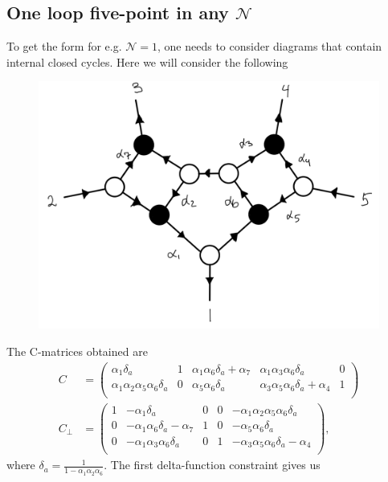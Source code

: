 \documentclass[letter,11pt]{article}
\begin{document}
\subsection{One loop five-point in any $\mathcal{N}$}
To get the form for e.g. $\mathcal{N}=1$, one needs to consider diagrams that contain internal closed  cycles. Here we will consider the following
\begin{figure}[H]
	\centering
	\includegraphics[width=0.5\linewidth]{5pt3l_2}
	\caption{}
	\label{fig:5pt3l_2}
\end{figure}
The C-matrices obtained are
\begin{equation}
	\begin{aligned}
		C
		&=\left(
		\begin{array}{ccccc}
			\alpha _1 \delta_a & 1 & \alpha _1 \alpha _6 \delta_a+\alpha _7 & \alpha _1 \alpha _3 \alpha _6 \delta_a & 0 \\
			\alpha _1 \alpha _2 \alpha _5 \alpha _6 \delta_a & 0 & \alpha _5 \alpha _6 \delta_a & \alpha _3 \alpha _5 \alpha _6 \delta_a+\alpha _4 & 1 \\
		\end{array}
		\right)\\
		C_\perp&=
		\left(
		\begin{array}{ccccc}
			1 & -\alpha _1\delta_a & 0 & 0 & -\alpha _1 \alpha _2 \alpha _5 \alpha _6 \delta_a \\
0 & -\alpha _1 \alpha _6 \delta_a-\alpha _7 & 1 & 0 & -\alpha _5 \alpha _6 \delta_a \\
0 & -\alpha _1 \alpha _3 \alpha _6 \delta_a & 0 & 1 & -\alpha _3 \alpha _5 \alpha _6 \delta_a-\alpha _4 \\
		\end{array}
		\right),
	\end{aligned}
\end{equation}
where $\delta_a=\frac{1}{1-\alpha_1\alpha_2\alpha_6}$. The first delta-function constraint gives us
\end{document}
